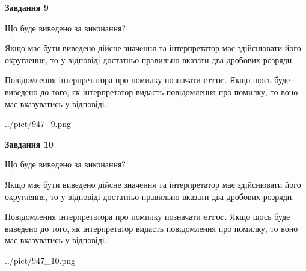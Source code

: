 \documentclass[12pt, ukrainian]{article}
\begin{document}
{\begin {Large}
{\begin {center}\textbf{Завдання 9}\end {center}}\par
Що буде виведено за виконання? \par

Якщо має бути виведено дійсне значення та інтерпретатор має здійснювати його округлення, 
то у відповіді достатньо правильно вказати два дробових розряди.

Повідомлення інтерпретатора про помилку позначати \textbf{error}.
Якщо щось буде виведено до того, як інтерпретатор видасть повідомлення про помилку, 
то воно має вказуватись у відповіді. \par

\begin{center}
	{../pict/947_9.png}
\end{center}
\newpage

{\begin {center}\textbf{Завдання 10}\end {center}}\par
Що буде виведено за виконання? \par

Якщо має бути виведено дійсне значення та інтерпретатор має здійснювати його округлення, 
то у відповіді достатньо правильно вказати два дробових розряди.

Повідомлення інтерпретатора про помилку позначати \textbf{error}.
Якщо щось буде виведено до того, як інтерпретатор видасть повідомлення про помилку, 
то воно має вказуватись у відповіді. \par

\begin{center}
	{../pict/947_10.png}
\end{center}
\newpage

\end {Large}}
\end{document}
